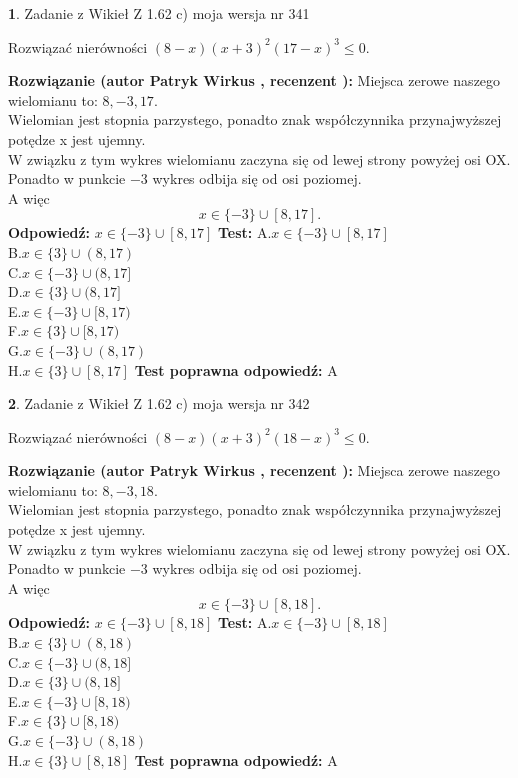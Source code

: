 \documentclass[12pt, a4paper]{article}
\theoremstyle{definition} %
\newtheorem{zad}{}
\newcommand{\zadStart}[1]{\begin{zad}#1\newline}
\newcommand{\zadStop}{\end{zad}}
\newcommand{\rozwStart}[2]{\noindent \textbf{Rozwiązanie (autor #1 , recenzent #2): }\newline}
\newcommand{\rozwStop}{\newline}
\newcommand{\odpStart}{\noindent \textbf{Odpowiedź:}\newline}
\newcommand{\odpStop}{\newline}
\newcommand{\testStart}{\noindent \textbf{Test:}\newline}
\newcommand{\testStop}{\newline}
\newcommand{\kluczStart}{\noindent \textbf{Test poprawna odpowiedź:}\newline}
\newcommand{\kluczStop}{\newline}
\begin{document}
\zadStart{Zadanie z Wikieł Z 1.62 c) moja wersja nr 341}

Rozwiązać nierówności $(8-x)(x+3)^{2}(17-x)^{3}\le0$.
\zadStop
\rozwStart{Patryk Wirkus}{}
Miejsca zerowe naszego wielomianu to: $8, -3, 17$.\\
Wielomian jest stopnia parzystego, ponadto znak współczynnika przy\linebreak najwyższej potędze x jest ujemny.\\ W związku z tym wykres wielomianu zaczyna się od lewej strony powyżej osi OX.\\
Ponadto w punkcie $-3$ wykres odbija się od osi poziomej.\\
A więc $$x \in \{-3\} \cup [8,17].$$
\rozwStop
\odpStart
$x \in \{-3\} \cup [8,17]$
\odpStop
\testStart
A.$x \in \{-3\} \cup [8,17]$\\
B.$x \in \{3\} \cup (8,17)$\\
C.$x \in \{-3\} \cup (8,17]$\\
D.$x \in \{3\} \cup (8,17]$\\
E.$x \in \{-3\} \cup [8,17)$\\
F.$x \in \{3\} \cup [8,17)$\\
G.$x \in \{-3\} \cup (8,17)$\\
H.$x \in \{3\} \cup [8,17]$
\testStop
\kluczStart
A
\kluczStop



\zadStart{Zadanie z Wikieł Z 1.62 c) moja wersja nr 342}

Rozwiązać nierówności $(8-x)(x+3)^{2}(18-x)^{3}\le0$.
\zadStop
\rozwStart{Patryk Wirkus}{}
Miejsca zerowe naszego wielomianu to: $8, -3, 18$.\\
Wielomian jest stopnia parzystego, ponadto znak współczynnika przy\linebreak najwyższej potędze x jest ujemny.\\ W związku z tym wykres wielomianu zaczyna się od lewej strony powyżej osi OX.\\
Ponadto w punkcie $-3$ wykres odbija się od osi poziomej.\\
A więc $$x \in \{-3\} \cup [8,18].$$
\rozwStop
\odpStart
$x \in \{-3\} \cup [8,18]$
\odpStop
\testStart
A.$x \in \{-3\} \cup [8,18]$\\
B.$x \in \{3\} \cup (8,18)$\\
C.$x \in \{-3\} \cup (8,18]$\\
D.$x \in \{3\} \cup (8,18]$\\
E.$x \in \{-3\} \cup [8,18)$\\
F.$x \in \{3\} \cup [8,18)$\\
G.$x \in \{-3\} \cup (8,18)$\\
H.$x \in \{3\} \cup [8,18]$
\testStop
\kluczStart
A
\kluczStop
\end{document}
